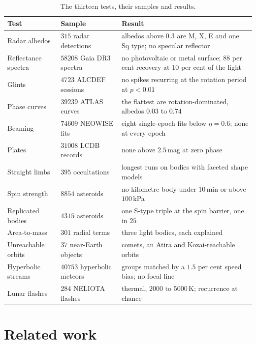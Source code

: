 \documentclass[3p,11pt]{elsarticle}
\begin{document}
\begin{table}[t]
\centering\small
\caption{The thirteen tests, their samples and results.}
\label{tab:tests}
\begin{tabular}{>{\raggedright\arraybackslash}p{} >{\raggedright\arraybackslash}p{} >{\raggedright\arraybackslash}p{}}
\toprule
Test & Sample & Result \\
\midrule
Radar albedos & $315$ radar detections & albedos above $0.3$ are M, X, E and one Sq type; no specular reflector \\
Reflectance spectra & $58208$ Gaia DR3 spectra & no photovoltaic or metal surface; $88$ per cent recovery at $10$ per cent of the light \\
Glints & $4723$ ALCDEF sessions & no spikes recurring at the rotation period at $p<0.01$ \\
Phase curves & $39239$ ATLAS curves & the flattest are rotation-dominated, albedos $0.03$ to $0.74$ \\
Beaming & $74609$ NEOWISE fits & eight single-epoch fits below $\eta=0.6$; none at every epoch \\
Plates & $31008$ LCDB records & none above $2.5$\,mag at zero phase \\
Straight limbs & $395$ occultations & longest runs on bodies with faceted shape models \\
Spin strength & $8854$ asteroids & no kilometre body under $10$\,min or above $100$\,kPa \\
Replicated bodies & $4315$ asteroids & one S-type triple at the spin barrier, one in $25$ \\
Area-to-mass & $301$ radial terms & three light bodies, each explained \\
Unreachable orbits & $37$ near-Earth objects & comets, an Atira and Kozai-reachable orbits \\
Hyperbolic streams & $40753$ hyperbolic meteors & groups matched by a $1.5$ per cent speed bias; no focal line \\
Lunar flashes & $284$ NELIOTA flashes & thermal, $2000$ to $5000$\,K; recurrence at chance \\
\bottomrule
\end{tabular}
\end{table}

\section{Related work}\label{sec:related}
\end{document}
